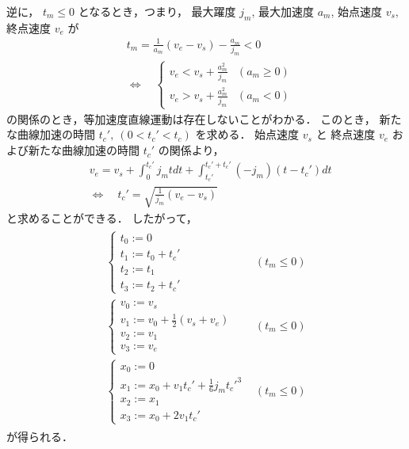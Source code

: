 \documentclass[a5paper]{ltjsarticle}
\begin{document}
逆に， $t_m \leq 0$ となるとき，つまり，
最大躍度 $j_m$, 最大加速度 $a_m$, 始点速度 $v_s$, 終点速度 $v_e$ が
\begin{align}
     &
    t_m = \frac{1}{a_m}(v_e-v_s) - \frac{a_m}{j_m} < 0
    \\
     &
    \Leftrightarrow
    \quad
    \left\{
    \begin{array}{ll}
        v_e < v_s + \frac{a_m^2}{j_m} & (a_m \ge 0)
        \\
        v_e > v_s + \frac{a_m^2}{j_m} & (a_m <0)
    \end{array}
    \right.
\end{align}
の関係のとき，等加速度直線運動は存在しないことがわかる．
このとき，
新たな曲線加速の時間 $t_c',~(0 < t_c' < t_c)$ を求める．
始点速度 $v_s$ と 終点速度 $v_e$ および新たな曲線加速の時間 $t_c'$ の関係より，
\begin{align}
     &
    v_e = v_s + \int_{0}^{t_c'} j_m t dt + \int_{t_c'}^{t_c'+t_c'} (-j_m) (t-t_c') dt
    \\
     &
    \Leftrightarrow\quad
    t_c' = \sqrt{\frac{1}{j_m}(v_e-v_s)}
\end{align}
と求めることができる．
したがって，
\begin{align}
    \begin{array}{ll}
        \left\{ \begin{array}{l}
            t_0 := 0          \\
            t_1 := t_0 + t_c' \\
            t_2 := t_1        \\
            t_3 := t_2 + t_c'
        \end{array} \right.
         &
        (t_m \leq 0)
        \\
        \left\{ \begin{array}{l}
            v_0 := v_s                                     \\
            v_1 := v_0 + \frac{1}{2}\left( v_s+v_e \right) \\
            v_2 := v_1                                     \\
            v_3 := v_e
        \end{array} \right.
         &
        (t_m \leq 0)
        \\
        \left\{ \begin{array}{l}
            x_0 := 0                                       \\
            x_1 := x_0 + v_1 t_c' + \frac{1}{6} j_m t_c'^3 \\
            x_2 := x_1                                     \\
            x_3 := x_0 + 2 v_1 t_c'
        \end{array} \right.
         &
        (t_m \leq 0)
    \end{array}
\end{align}
が得られる．
\end{document}
